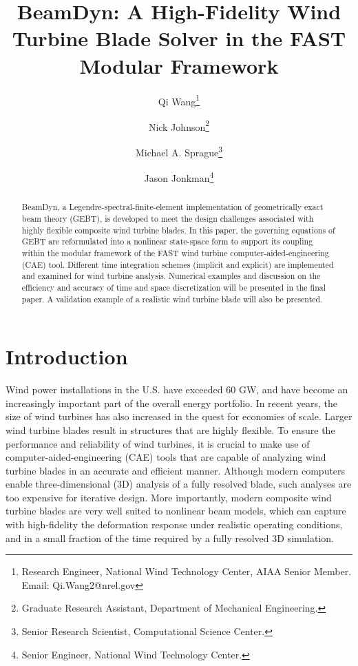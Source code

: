 \documentclass{aiaa-tc}
\title{BeamDyn: A High-Fidelity Wind Turbine Blade Solver in the FAST
Modular Framework}
\author[1]{Qi Wang\thanks{Research Engineer, National Wind Technology Center, AIAA Senior Member. Email: Qi.Wang2@nrel.gov}}
\author[2]{Nick Johnson\thanks{Graduate Research Assistant, Department of
Mechanical Engineering.}}
\author[1]{Michael A. Sprague\thanks{Senior Research Scientist, 
Computational Science Center.}}
\author[1]{Jason Jonkman\thanks{Senior Engineer, National Wind Technology Center.}}
\affil[1]{National Renewable Energy Laboratory, Golden, CO 80401}
\affil[2]{Colorado School of Mines, Golden, CO 80401}
\begin{document}
\maketitle

\begin{abstract}
{BeamDyn, a Legendre-spectral-finite-element implementation of geometrically
exact beam theory (GEBT), is developed to meet the design challenges
associated with highly flexible composite wind turbine blades. In this
paper, the governing equations of GEBT are reformulated into a nonlinear
state-space form to support its coupling within the
modular framework of the FAST wind turbine
computer-aided-engineering (CAE) tool. Different time integration
schemes (implicit and explicit) are implemented and examined for wind
turbine analysis.  Numerical examples and discussion on the efficiency and
accuracy of time and space discretization will be presented in the final
paper. A validation example of a realistic wind turbine blade will also be
presented.}     
\end{abstract}

\section{Introduction} Wind power installations in the U.S. have exceeded 60
GW, and have become an increasingly important part of the overall energy
portfolio. In recent years, the size of wind turbines has also increased in
the quest for economies of scale.  Larger wind turbine blades result in
structures that are highly flexible.  To ensure the performance and
reliability of wind turbines, it is crucial to make use of
computer-aided-engineering (CAE) tools that are capable of analyzing wind
turbine blades in an accurate and efficient manner. Although modern
computers enable three-dimensional (3D) analysis
of a fully resolved blade, such analyses are too
expensive for iterative design. More importantly, modern composite wind
turbine blades are very well suited to nonlinear beam models, which can
capture with high-fidelity the deformation response under realistic
operating conditions, and in a small fraction of the time required by a
fully resolved 3D simulation. 
\end{document}
